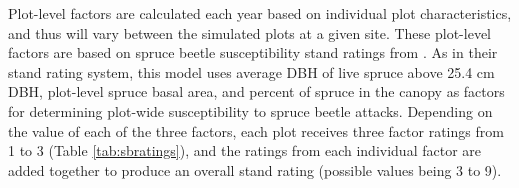 \documentclass[a4paper, 12pt] {report}
\begin{document}
Plot-level factors are calculated each year based on individual plot characteristics, and thus will vary between the simulated plots at a given site. These plot-level factors are based on spruce beetle susceptibility stand ratings from . As in their stand rating system, this model uses average DBH of live spruce above 25.4 cm DBH, plot-level spruce basal area, and percent of spruce in the canopy as factors for determining plot-wide susceptibility to spruce beetle attacks. Depending on the value of each of the three factors, each plot receives three factor ratings from 1 to 3 (Table \ref{tab:sbratings}), and the ratings from each individual factor are added together to produce an overall stand rating (possible values being 3 to 9). 

\begin{table}
  \begin{center}
    \caption{Values of plot factors associated with each factor rating used to calculate overall plot-wide susceptibility to spruce beetle infestation from \protect{}.}
    \label{tab:sbratings}
  \end{center}
\end{table}
\end{document}
